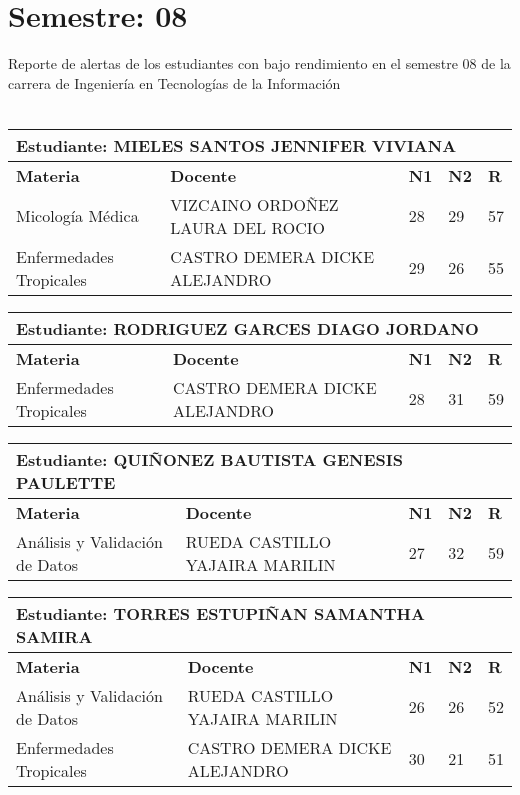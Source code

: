 \section{Semestre: 08}
        Reporte de alertas de los estudiantes con bajo rendimiento en el semestre 08 de la carrera de 
        Ingeniería en Tecnologías de la Información\\\\\small
\begin{tabularx}{\textwidth}{|p{5cm}|p{7cm}|X|X|X|}
\hline
\multicolumn{5}{|p{\dimexpr\textwidth-2\tabcolsep-2\arrayrulewidth}|}{\textbf{Estudiante: MIELES SANTOS JENNIFER VIVIANA }}\\\hline
\textbf{Materia} & \textbf{Docente} & \textbf{N1} & \textbf{N2} & \textbf{R} \\ \hline
Micología Médica & VIZCAINO ORDOÑEZ LAURA DEL ROCIO   & 28 & 29& 57 \\ \hline
Enfermedades Tropicales & CASTRO DEMERA DICKE ALEJANDRO  & 29 & 26& 55 \\ \hline
\end{tabularx}\vspace{10mm}
\small
\begin{tabularx}{\textwidth}{|p{5cm}|p{7cm}|X|X|X|}
\hline
\multicolumn{5}{|p{\dimexpr\textwidth-2\tabcolsep-2\arrayrulewidth}|}{\textbf{Estudiante: RODRIGUEZ GARCES DIAGO JORDANO }}\\\hline
\textbf{Materia} & \textbf{Docente} & \textbf{N1} & \textbf{N2} & \textbf{R} \\ \hline
Enfermedades Tropicales & CASTRO DEMERA DICKE ALEJANDRO  & 28 & 31& 59 \\ \hline
\end{tabularx}\vspace{10mm}
\small
\begin{tabularx}{\textwidth}{|p{5cm}|p{7cm}|X|X|X|}
\hline
\multicolumn{5}{|p{\dimexpr\textwidth-2\tabcolsep-2\arrayrulewidth}|}{\textbf{Estudiante: QUIÑONEZ BAUTISTA GENESIS PAULETTE }}\\\hline
\textbf{Materia} & \textbf{Docente} & \textbf{N1} & \textbf{N2} & \textbf{R} \\ \hline
Análisis y Validación de Datos & RUEDA CASTILLO YAJAIRA MARILIN  & 27 & 32& 59 \\ \hline
\end{tabularx}\vspace{10mm}
\small
\begin{tabularx}{\textwidth}{|p{5cm}|p{7cm}|X|X|X|}
\hline
\multicolumn{5}{|p{\dimexpr\textwidth-2\tabcolsep-2\arrayrulewidth}|}{\textbf{Estudiante: TORRES ESTUPIÑAN SAMANTHA SAMIRA }}\\\hline
\textbf{Materia} & \textbf{Docente} & \textbf{N1} & \textbf{N2} & \textbf{R} \\ \hline
Análisis y Validación de Datos & RUEDA CASTILLO YAJAIRA MARILIN  & 26 & 26& 52 \\ \hline
Enfermedades Tropicales & CASTRO DEMERA DICKE ALEJANDRO  & 30 & 21& 51 \\ \hline
\end{tabularx}\vspace{10mm}
